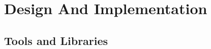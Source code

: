 \chapter{Design And Implementation} %
\label{chap:design}


\section{Tools and Libraries}
\label{sec:tools}

